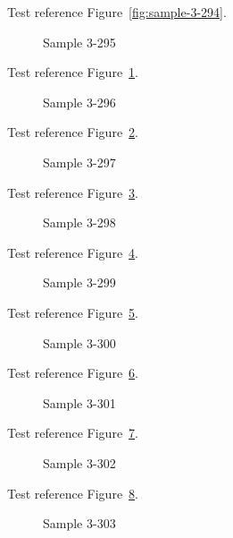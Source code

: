 Test reference Figure~\ref{fig:sample-3-294}.

\begin{figure}[tbhp]
\caption{Sample 3-295}
\label{fig:sample-3-295}
\end{figure}

Test reference Figure~\ref{fig:sample-3-295}.

\begin{figure}[tbhp]
\caption{Sample 3-296}
\label{fig:sample-3-296}
\end{figure}

Test reference Figure~\ref{fig:sample-3-296}.

\begin{figure}[tbhp]
\caption{Sample 3-297}
\label{fig:sample-3-297}
\end{figure}

Test reference Figure~\ref{fig:sample-3-297}.

\begin{figure}[tbhp]
\caption{Sample 3-298}
\label{fig:sample-3-298}
\end{figure}

Test reference Figure~\ref{fig:sample-3-298}.

\begin{figure}[tbhp]
\caption{Sample 3-299}
\label{fig:sample-3-299}
\end{figure}

Test reference Figure~\ref{fig:sample-3-299}.

\begin{figure}[tbhp]
\caption{Sample 3-300}
\label{fig:sample-3-300}
\end{figure}

Test reference Figure~\ref{fig:sample-3-300}.

\begin{figure}[tbhp]
\caption{Sample 3-301}
\label{fig:sample-3-301}
\end{figure}

Test reference Figure~\ref{fig:sample-3-301}.

\begin{figure}[tbhp]
\caption{Sample 3-302}
\label{fig:sample-3-302}
\end{figure}

Test reference Figure~\ref{fig:sample-3-302}.

\begin{figure}[tbhp]
\caption{Sample 3-303}
\label{fig:sample-3-303}
\end{figure}

